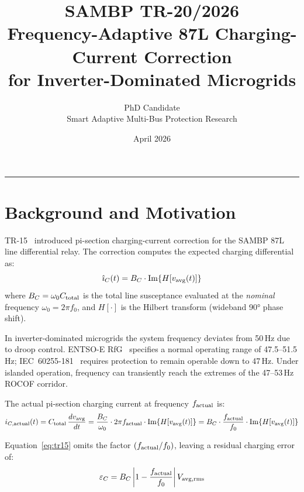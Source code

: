 \documentclass[11pt, a4paper]{article}
\title{\textbf{SAMBP TR-20/2026}\\[4pt]
       \large Frequency-Adaptive 87L Charging-Current Correction\\
       for Inverter-Dominated Microgrids}
\author{PhD Candidate\\[2pt]
        \small Smart Adaptive Multi-Bus Protection Research}
\date{April 2026}
\begin{document}
\maketitle
\tableofcontents
\vspace{6pt}\hrule\vspace{10pt}

\section{Background and Motivation}
\label{sec:background}

TR-15~\cite{SAMBP_TR15} introduced pi-section charging-current correction for
the SAMBP 87L line differential relay.  The correction computes the expected
charging differential as:
\begin{equation}
  \hat{\imath}_C(t) = B_C \cdot \mathrm{Im}\!\left\{H[v_{\rm avg}(t)]\right\}
  \label{eq:tr15}
\end{equation}
where $B_C = \omega_0 C_{\rm total}$ is the total line susceptance evaluated at
the \emph{nominal} frequency $\omega_0 = 2\pi f_0$, and $H[\cdot]$ is the
Hilbert transform (wideband 90° phase shift).

In inverter-dominated microgrids the system frequency deviates from 50\,Hz due
to droop control.  ENTSO-E RfG~\cite{ENTSO_RfG} specifies a normal operating
range of 47.5--51.5\,Hz; IEC~60255-181~\cite{IEC_60255_181} requires protection
to remain operable down to 47\,Hz.  Under islanded operation, frequency can
transiently reach the extremes of the 47--53\,Hz ROCOF corridor.

The actual pi-section charging current at frequency $f_{\rm actual}$ is:
\begin{equation}
  i_{C,\rm actual}(t)
    = C_{\rm total}\,\frac{dv_{\rm avg}}{dt}
    = \frac{B_C}{\omega_0} \cdot 2\pi f_{\rm actual}
      \cdot \mathrm{Im}\!\left\{H[v_{\rm avg}(t)]\right\}
    = B_C \cdot \frac{f_{\rm actual}}{f_0}
      \cdot \mathrm{Im}\!\left\{H[v_{\rm avg}(t)]\right\}
  \label{eq:true_charging}
\end{equation}

Equation~\eqref{eq:tr15} omits the factor $(f_{\rm actual}/f_0)$, leaving a
residual charging error of:
\begin{equation}
  \varepsilon_C = B_C \left|1 - \frac{f_{\rm actual}}{f_0}\right| V_{\rm avg,rms}
  \label{eq:error}
\end{equation}
\end{document}
